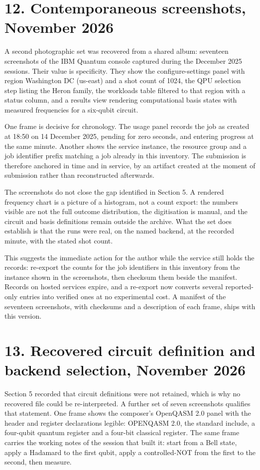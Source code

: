 \documentclass[11pt]{article}
\begin{document}
\section*{12. Contemporaneous screenshots, November 2026}

A second photographic set was recovered from a shared album: seventeen screenshots of the IBM Quantum console captured during the December 2025 sessions. Their value is specificity. They show the configure-settings panel with region Washington DC (us-east) and a shot count of 1024, the QPU selection step listing the Heron family, the workloads table filtered to that region with a status column, and a results view rendering computational basis states with measured frequencies for a six-qubit circuit.

One frame is decisive for chronology. The usage panel records the job as created at 18:50 on 14 December 2025, pending for zero seconds, and entering progress at the same minute. Another shows the service instance, the resource group and a job identifier prefix matching a job already in this inventory. The submission is therefore anchored in time and in service, by an artifact created at the moment of submission rather than reconstructed afterwards.

The screenshots do not close the gap identified in Section 5. A rendered frequency chart is a picture of a histogram, not a count export: the numbers visible are not the full outcome distribution, the digitisation is manual, and the circuit and basis definitions remain outside the archive. What the set does establish is that the runs were real, on the named backend, at the recorded minute, with the stated shot count.

This suggests the immediate action for the author while the service still holds the records: re-export the counts for the job identifiers in this inventory from the instance shown in the screenshots, then checksum them beside the manifest. Records on hosted services expire, and a re-export now converts several reported-only entries into verified ones at no experimental cost. A manifest of the seventeen screenshots, with checksums and a description of each frame, ships with this version.

\section*{13. Recovered circuit definition and backend selection, November 2026}

Section 5 recorded that circuit definitions were not retained, which is why no recovered file could be re-interpreted. A further set of seven screenshots qualifies that statement. One frame shows the composer's OpenQASM 2.0 panel with the header and register declarations legible: OPENQASM 2.0, the standard include, a four-qubit quantum register and a four-bit classical register. The same frame carries the working notes of the session that built it: start from a Bell state, apply a Hadamard to the first qubit, apply a controlled-NOT from the first to the second, then measure.
\end{document}
